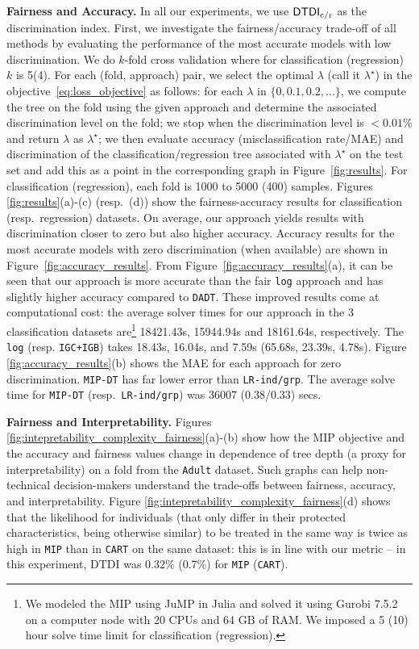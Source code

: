 \documentclass[letterpaper]{article} %
\theoremstyle{definition}
\newcommand{\1}{\ensuremath{{\rm e}}} %
\begin{document}
\noindent\textbf{Fairness and Accuracy.} In all our experiments, we use ${\mathsf{DTDI_{\rm c/\rm r}}}$ as the discrimination index. First, we investigate the fairness/accuracy trade-off of all methods by evaluating the performance of the most accurate models with low discrimination. We do $k$-fold cross validation where for classification (regression) $k$ is 5(4). For each (fold, approach) pair, we select the optimal $\lambda$ (call it $\lambda^\star$) in the objective~\eqref{eq:loss_objective} as follows: for each $\lambda$ in $\{0,0.1,0.2,\hdots\}$, we compute the tree on the fold using the given approach and determine the associated discrimination level on the fold; we stop when the discrimination level is $<0.01\%$ and return $\lambda$ as $\lambda^\star$; we then evaluate accuracy (misclassification rate/MAE) and discrimination of the classification/regression tree associated with $\lambda^\star$ on the test set and add this as a point in the corresponding graph in Figure~\ref{fig:results}. For classification (regression), each fold is 1000 to 5000 (400) samples. Figures \ref{fig:results}(a)-(c) (resp.\ (d)) show the fairness-accuracy results for classification (resp.\ regression) datasets. On average, our approach yields results with discrimination closer to zero but also higher accuracy. Accuracy results for the most accurate models with zero discrimination (when available) are shown in Figure~\ref{fig:accuracy_results}. From Figure~\ref{fig:accuracy_results}(a), it can be seen that our approach is more accurate than the fair \texttt{log} approach and has slightly higher accuracy compared to \texttt{DADT}. These improved results come at computational cost: the average solver times for our approach in the 3 classification datasets are\footnote{We modeled the MIP using JuMP in Julia \cite{DunningHuchetteLubin2017} and solved it using Gurobi 7.5.2 on a computer node with 20 CPUs and 64 GB of RAM. We imposed a 5 (10) hour solve time limit for classification (regression).} 18421.43s, 15944.94s and 18161.64s, respectively. The \texttt{log} (resp. \texttt{IGC+IGB}) takes 18.43s, 16.04s, and 7.59s (65.68s, 23.39s, 4.78s).
 Figure \ref{fig:accuracy_results}(b) shows the MAE for each approach for zero discrimination. \texttt{MIP-DT} has far lower error than \texttt{LR-ind/grp}. The average solve time for \texttt{MIP-DT} (resp.\ \texttt{LR-ind/grp}) was 36007 (0.38/0.33) secs. 

\noindent\textbf{Fairness and Interpretability.}  Figures \ref{fig:intepretability_complexity_fairness}(a)-(b) show how the MIP objective and the accuracy and fairness values change in dependence of tree depth (a proxy for interpretability) on a fold from the \texttt{Adult} dataset. Such graphs can help non-technical decision-makers understand the trade-offs between fairness, accuracy, and interpretability. Figure \ref{fig:intepretability_complexity_fairness}(d) shows that the likelihood for individuals (that only differ in their protected characteristics, being otherwise similar) to be treated in the same way is twice as high in \texttt{MIP} than in \texttt{CART} on the same dataset: this is in line with our metric -- in this experiment, DTDI was 0.32\% (0.7\%) for \texttt{MIP} (\texttt{CART}). 
\end{document}
